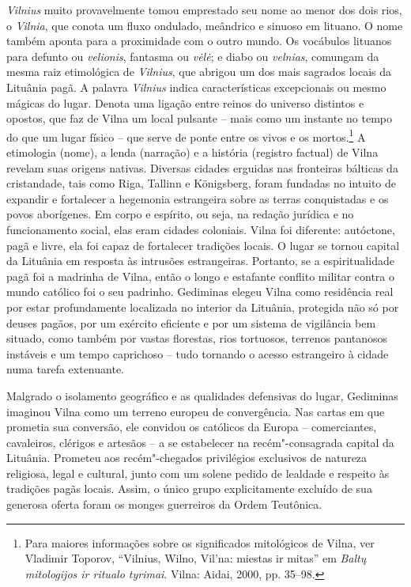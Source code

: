 \textit{Vilnius} muito provavelmente tomou emprestado seu nome ao menor dos dois
rios, o \textit{Vilnia}, que conota um fluxo ondulado, meândrico e sinuoso
em lituano. O nome também aponta para a proximidade com o outro mundo.
Os vocábulos lituanos para defunto ou \textit{velionis}, fantasma ou \textit{vėlė}; 
e diabo ou \textit{velnias}, comungam da mesma raiz
etimológica de \textit{Vilnius}, que abrigou um dos mais sagrados locais da
Lituânia pagã. A palavra \textit{Vilnius} indica características excepcionais ou
mesmo mágicas do lugar. Denota uma ligação entre reinos do universo
distintos e opostos, que faz de Vilna um local pulsante -- mais como um
instante no tempo do que um lugar físico -- que serve de ponte entre os
vivos e os mortos.\footnote{Para maiores informações sobre os significados mitológicos de Vilna, ver Vladimir Toporov, ``Vilnius, Wilno, Vil'na: miestas ir mitas'' em \textit{Baltų mitologijos ir ritualo tyrimai}. Vilna: Aidai, 2000, pp. 35--98.}
A etimologia (nome), a lenda (narração) e a história (registro factual)
de Vilna revelam suas origens nativas. Diversas cidades erguidas nas
fronteiras bálticas da cristandade, tais como Riga, Tallinn e
Königsberg, foram fundadas no intuito de expandir e fortalecer a
hegemonia estrangeira sobre as terras conquistadas e os povos
aborígenes. Em corpo e espírito, ou seja, na redação jurídica e no
funcionamento social, elas eram cidades coloniais. Vilna foi diferente: autóctone, 
pagã e livre, ela foi capaz de fortalecer tradições locais.
O lugar se tornou capital da Lituânia em resposta às intrusões
estrangeiras. Portanto, se a espiritualidade pagã foi a madrinha de
Vilna, então o longo e estafante conflito militar contra o mundo
católico foi o seu padrinho. Gediminas elegeu Vilna como residência real
por estar profundamente localizada no interior da Lituânia, protegida
não só por deuses pagãos, por um exército eficiente e por um sistema de
vigilância bem situado, como também por vastas florestas, rios
tortuosos, terrenos pantanosos instáveis e um tempo caprichoso -- tudo
tornando o acesso estrangeiro à cidade numa tarefa extenuante.

Malgrado o isolamento geográfico e as qualidades defensivas do lugar,
Gediminas imaginou Vilna como um terreno europeu de convergência. Nas
cartas em que prometia sua conversão, ele convidou os católicos da
Europa -- comerciantes, cavaleiros, clérigos e artesãos -- a se
estabelecer na recém"-consagrada capital da Lituânia. Prometeu aos
recém"-chegados privilégios exclusivos de natureza religiosa, legal e
cultural, junto com um solene pedido de lealdade e respeito às tradições
pagãs locais. Assim, o único grupo explicitamente excluído de sua
generosa oferta foram os monges guerreiros da Ordem Teutônica.

